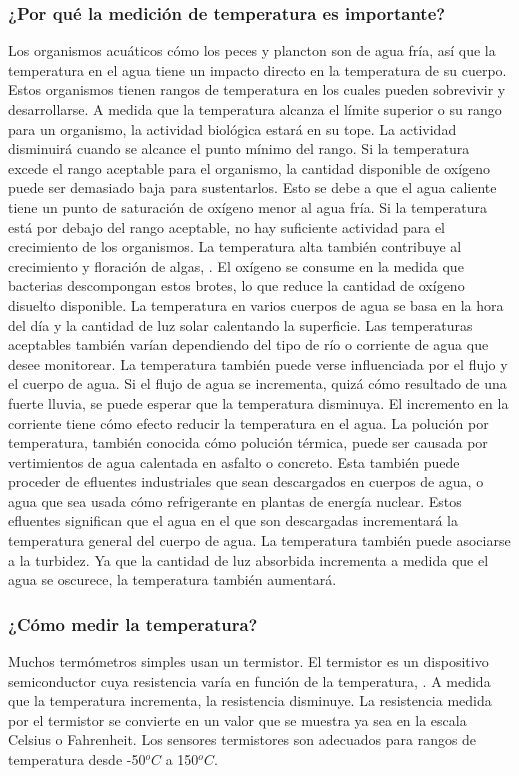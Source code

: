 \subsubsection{¿Por qu\'e la medición de temperatura es importante?}
Los organismos acu\'aticos c\'omo los peces y plancton son de agua fr\'ia, as\'i que la temperatura en el agua tiene un impacto directo en la temperatura de su cuerpo. 
Estos organismos tienen rangos de temperatura en los cuales pueden sobrevivir y desarrollarse. 
A medida que la temperatura alcanza el l\'imite superior o su rango para un organismo, la actividad biol\'ogica estar\'a en su tope. 
La actividad disminuir\'a cuando se alcance el punto mínimo del rango. 
Si la temperatura excede el rango aceptable para el organismo, la cantidad disponible de ox\'igeno puede ser demasiado baja para sustentarlos. 
Esto se debe a que el agua caliente tiene un punto de saturaci\'on de ox\'igeno menor al agua fr\'ia. 
Si la temperatura est\'a por debajo del rango aceptable, no hay suficiente actividad para el crecimiento de los organismos. 
La temperatura alta tambi\'en contribuye al crecimiento y floración de algas, \cite{cruzado_campos_aplicacion_2021}.
El oxígeno se consume en la medida que bacterias descompongan estos brotes, lo que reduce la cantidad de oxígeno disuelto disponible.
La temperatura en varios cuerpos de agua se basa en la hora del día y la cantidad de luz solar calentando la superficie.
Las temperaturas aceptables tambi\'en var\'ian dependiendo del tipo de r\'io o corriente de agua que desee monitorear. 
La temperatura tambi\'en puede verse influenciada por el flujo y el cuerpo de agua. 
Si el flujo de agua se incrementa, quiz\'a c\'omo resultado de una fuerte lluvia, se puede esperar que la temperatura disminuya. 
El incremento en la corriente tiene c\'omo efecto reducir la temperatura en el agua.
La poluci\'on por temperatura, tambi\'en conocida c\'omo poluci\'on t\'ermica, puede ser causada por vertimientos de agua calentada en asfalto o concreto. 
Esta tambi\'en puede proceder de efluentes industriales que sean descargados en cuerpos de agua, o agua que sea usada cómo refrigerante en plantas de energ\'ia nuclear. 
Estos efluentes significan que el agua en el que son descargadas incrementar\'a la temperatura general del cuerpo de agua.  
La temperatura también puede asociarse a la turbidez.  
Ya que la cantidad de luz absorbida incrementa a medida que el agua se oscurece, la temperatura también aumentar\'a.

\subsubsection{¿Cómo medir la temperatura?}
Muchos termómetros simples usan un termistor.  
El termistor es un dispositivo semiconductor cuya resistencia varía en función de la temperatura, \cite{asale_termistor_nodate}. 
A medida que la temperatura incrementa, la resistencia disminuye.  
La resistencia medida por el termistor se convierte en un valor que se muestra ya sea en la escala Celsius o Fahrenheit.  
Los sensores termistores son adecuados para rangos de temperatura desde -50$^{o}C$ a  150$^{o}C$.

